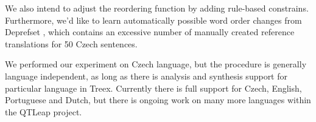 We also intend to adjust the reordering function by adding rule-based constrains. 
Furthermore, we'd like to learn automatically possible
word order changes from Deprefset \cite{bojar-scratching}, which contains 
an excessive number of manually created reference translations for 50 
Czech sentences.

We performed our experiment on Czech language, but the procedure is generally 
language independent, as long as there is analysis and synthesis support for 
particular language in Treex. Currently there is full support for Czech, 
English, Portuguese and Dutch, but there is ongoing work on many more languages 
within the QTLeap project.



